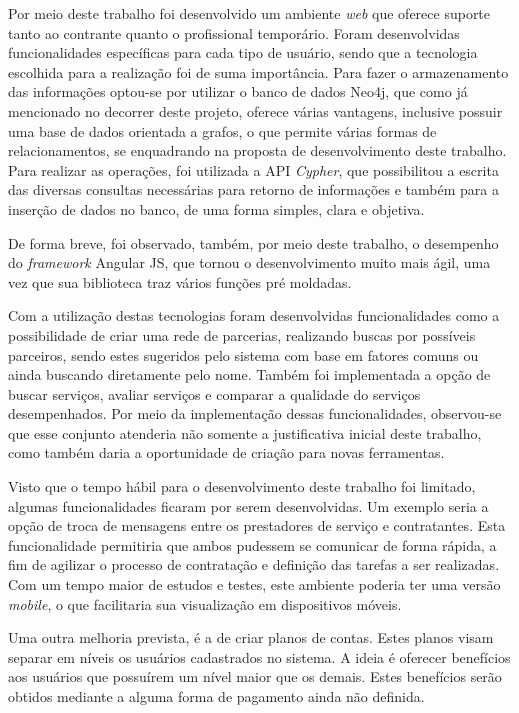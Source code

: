\par  Por meio deste trabalho foi desenvolvido um ambiente \textit{web} que oferece suporte tanto ao contrante quanto o profissional temporário. Foram desenvolvidas funcionalidades específicas para cada tipo de usuário, sendo que a tecnologia escolhida para a realização foi de suma importância. Para fazer o armazenamento das informações optou-se por utilizar o banco de dados Neo4j, que como já mencionado no decorrer deste projeto, oferece várias vantagens, inclusive possuir uma base de dados orientada a grafos, o que permite várias formas de relacionamentos, se enquadrando na proposta de desenvolvimento deste trabalho. Para realizar as operações, foi utilizada a API \textit{Cypher}, que possibilitou a escrita das diversas consultas necessárias para retorno de informações e também para a inserção de dados no banco, de uma forma simples, clara e objetiva. 

\par De forma breve, foi observado, também, por meio deste trabalho, o desempenho do \textit{framework} Angular JS, que tornou o desenvolvimento muito mais ágil, uma vez que sua biblioteca traz vários funções pré moldadas.

\par Com a utilização destas tecnologias foram desenvolvidas funcionalidades como a possibilidade de criar uma rede de parcerias, realizando buscas por possíveis parceiros, sendo estes sugeridos pelo sistema com base em fatores comuns ou ainda buscando diretamente pelo nome. Também foi implementada a opção de buscar serviços, avaliar serviços e comparar a qualidade do serviços desempenhados. Por meio da implementação dessas funcionalidades, observou-se que esse conjunto  atenderia não somente a justificativa inicial deste trabalho, como também daria a oportunidade de criação para novas ferramentas.

\par Visto que o tempo hábil para o desenvolvimento deste trabalho foi limitado, algumas funcionalidades ficaram por serem desenvolvidas. Um exemplo seria a opção de troca de mensagens entre os prestadores de serviço e contratantes. Esta funcionalidade permitiria que ambos pudessem se comunicar de forma rápida, a fim de agilizar o processo de contratação e definição das tarefas a ser realizadas. Com um tempo maior de estudos e testes, este ambiente poderia ter uma versão \textit{mobile}, o que facilitaria sua visualização em dispositivos móveis. 

\par Uma outra melhoria prevista, é a de criar planos de contas. Estes planos visam separar em níveis os usuários cadastrados no sistema. A ideia é oferecer benefícios aos usuários que possuírem um nível maior que os demais. Estes benefícios serão obtidos mediante a alguma forma de pagamento ainda não definida.

